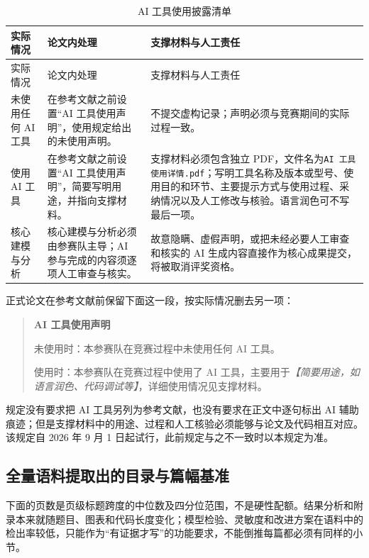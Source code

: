 \documentclass[UTF8,zihao=-4]{ctexart}
\newcommand{\slot}[1]{\textcolor{inkblue}{\textit{【#1】}}}
\begin{document}
\begin{longtable}{p{2.7cm}p{5.7cm}p{6.2cm}}
\caption{AI 工具使用披露清单}\label{tab:official-ai-rules}\\
\toprule
实际情况 & 论文内处理 & 支撑材料与人工责任\\
\midrule
\endfirsthead
\toprule
实际情况 & 论文内处理 & 支撑材料与人工责任\\
\midrule
\endhead
未使用任何 AI 工具 & 在参考文献之前设置“AI 工具使用声明”，使用规定给出的未使用声明。 & 不提交虚构记录；声明必须与竞赛期间的实际过程一致。\\
使用 AI 工具 & 在参考文献之前设置“AI 工具使用声明”，简要写明用途，并指向支撑材料。 & 支撑材料必须包含独立 PDF，文件名为\texttt{AI 工具使用详情.pdf}；写明工具名称及版本或型号、使用目的和环节、主要提示方式与使用过程、采纳情况以及人工修改与核验。语言润色可不写最后一项。\\
核心建模与分析 & 核心建模与分析必须由参赛队主导；AI 参与完成的内容须逐项人工审查与核实。 & 故意隐瞒、虚假声明，或把未经必要人工审查和核实的 AI 生成内容直接作为核心成果提交，将被取消评奖资格。\\
\bottomrule
\end{longtable}

正式论文在参考文献前保留下面这一段，按实际情况删去另一项：
\begin{quote}\small
\textbf{AI 工具使用声明}

未使用时：本参赛队在竞赛过程中未使用任何 AI 工具。

使用时：本参赛队在竞赛过程中使用了 AI 工具，主要用于\slot{简要用途，如语言润色、代码调试等}，详细使用情况见支撑材料。
\end{quote}
规定没有要求把 AI 工具另列为参考文献，也没有要求在正文中逐句标出 AI 辅助痕迹；但是支撑材料中的用途、过程和人工核验必须能够与论文及代码相互对应。该规定自 2026 年 9 月 1 日起试行，此前规定与之不一致时以本规定为准。

\subsection{全量语料提取出的目录与篇幅基准}

下面的页数是页级标题跨度的中位数及四分位范围，不是硬性配额。结果分析和附录本来就随题目、图表和代码长度变化；模型检验、灵敏度和改进方案在语料中的检出率较低，只能作为“有证据才写”的功能要求，不能倒推每篇都必须有同样的小节。
\end{document}
